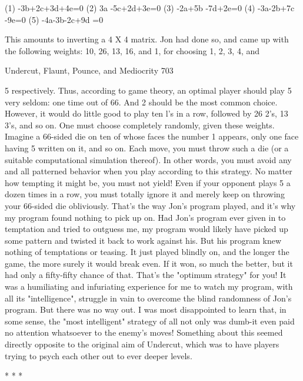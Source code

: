        (1)            -3b+2c+3d+4e=0
       (2)           3a -5c+2d+3e=0
       (3)          -2a+5b -7d+2e=0
       (4)          -3a-2b+7c -9e=0
       (5)          -4a-3b-2c+9d =0

        This amounts to inverting a 4 X 4 matrix. Jon had done so, and came up with
the following weights: 10, 26, 13, 16, and 1, for choosing 1, 2, 3, 4, and




Undercut, Flaunt, Pounce, and Mediocrity                                               703

5 respectively. Thus, according to game theory, an optimal player should play 5 very
seldom: one time out of 66. And 2 should be the most common choice. However, it
would do little good to play ten l's in a row, followed by 26 2's, 13 3's, and so on. One
must choose completely randomly, given these weights.
        Imagine a 66-sided die on ten of whose faces the number 1 appears, only one
face having 5 written on it, and so on. Each move, you must throw such a die (or a
suitable computational simulation thereof). In other words, you must avoid any and all
patterned behavior when you play according to this strategy. No matter how tempting
it might be, you must not yield! Even if your opponent plays 5 a dozen times in a row,
you must totally ignore it and merely keep on throwing your 66-sided die obliviously.
That's the way Jon's program played, and it's why my program found nothing to pick
up on. Had Jon's program ever given in to temptation and tried to outguess me, my
program would likely have picked up some pattern and twisted it back to work against
his. But his program knew nothing of temptations or teasing. It just played blindly on,
and the longer the game, the more surely it would break even. If it won, so much the
better, but it had only a fifty-fifty chance of that. That's the "optimum strategy" for
you!
        It was a humiliating and infuriating experience for me to watch my program,
with all its "intelligence", struggle in vain to overcome the blind randomness of Jon's
program. But there was no way out. I was most disappointed to learn that, in some
sense, the "most intelligent" strategy of all not only was dumb-it even paid no
attention whatsoever to the enemy's moves! Something about this seemed directly
opposite to the original aim of Undercut, which was to have players trying to psych
each other out to ever deeper levels.

                                       *   *   *

